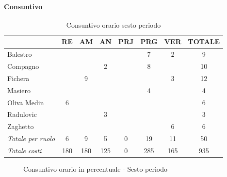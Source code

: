 \documentclass[a4paper,12pt]{article}
\begin{document}
            \paragraph{Consuntivo}
                \begin{table}[H]
                \centering
                \begin{tabular}{|l|c|c|c|c|c|c|c|}
                \hline
                    \rowcolor{lightgray}{\textbf{Membro}} & {\textbf{RE}} & {\textbf{AM}} & {\textbf{AN}} & {\textbf{PRJ}} & {\textbf{PRG}} & {\textbf{VER}} & {\textbf{TOTALE}}\\
                \hline
                    Balestro & & & & & 7 & 2 & 9\\
                \hline
                    Compagno & & & 2 & & 8 & & 10\\
                \hline
                    Fichera & & 9 & & & & 3 & 12\\
                \hline
                    Masiero & & & & & 4 & & 4\\
                \hline
                    Oliva Medin & 6 & & & & & & 6\\
                \hline
                    Radulovic & & & 3 & & & & 3\\
                \hline
                    Zaghetto & & & & & & 6 & 6\\
                \hline
                    \rowcolor{lightgray}\textit{Totale per ruolo} & 6 & 9 & 5 & 0 & 19 & 11 & 50\\
                \hline
                    \rowcolor{lightgray}\textit{Totale costi} & 180 & 180 & 125 & 0 & 285 & 165 & 935\\
                \hline
                \end{tabular}
                \caption{Consuntivo orario sesto periodo}
                \end{table}

                \begin{figure}[H]
                \centering
                \caption{Consuntivo orario in percentuale - Sesto periodo}
                \end{figure}
                
\end{document}
